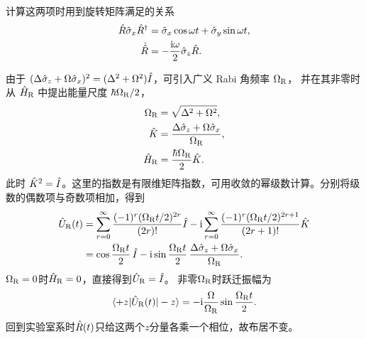 计算这两项时用到旋转矩阵满足的关系
\[
    \begin{alignedat}{1}
        \hat{R}\hat{\sigma}_x\hat{R}^\dagger
            &= \hat{\sigma}_x\cos\omega t + \hat{\sigma}_y\sin\omega t,\\
        \dot{\hat{R}} &= -\frac{\mathrm{i}\omega}{2}\hat{\sigma}_z\hat{R}.
    \end{alignedat}
\]

由于 $(\Delta\hat{\sigma}_z + \Omega\hat{\sigma}_x)^2 = (\Delta^2 + \Omega^2)\hat{I}$，可引入广义 Rabi 角频率 $\Omega_{\mathrm{R}}$，
并在其非零时从 $\hat{H}_{\mathrm{R}}$ 中提出能量尺度 $\hbar\Omega_{\mathrm{R}}/2$，
\begin{subequations}
    \begin{align}
        \Omega_{\mathrm{R}} &= \sqrt{\Delta^2 + \Omega^2},\\
        \hat{K} &= \frac{\Delta\hat{\sigma}_z + \Omega\hat{\sigma}_x}{\Omega_{\mathrm{R}}},\\
        \hat{H}_{\mathrm{R}} &= \frac{\hbar\Omega_{\mathrm{R}}}{2}\hat{K} .
    \end{align}
\end{subequations}
此时 $\hat{K}^2 = \hat{I}$。这里的指数是有限维矩阵指数，可用收敛的幂级数计算。分别将级数的偶数项与奇数项相加，得到
\begin{equation}
    \begin{alignedat}{1}
        \hat{U}_{\mathrm{R}}(t) &= \sum_{r=0}^\infty
            \frac{(-1)^r(\Omega_{\mathrm{R}}t/2)^{2r}}{(2r)!}\hat{I}
            - \mathrm{i}\sum_{r=0}^\infty
            \frac{(-1)^r(\Omega_{\mathrm{R}}t/2)^{2r+1}}{(2r + 1)!}\hat{K}\\
        &= \cos\frac{\Omega_{\mathrm{R}}t}{2}\,\hat{I}
            - \mathrm{i}\sin\frac{\Omega_{\mathrm{R}}t}{2}\,
            \frac{\Delta\hat{\sigma}_z + \Omega\hat{\sigma}_x}{\Omega_{\mathrm{R}}}.
    \end{alignedat}
\end{equation}
$\Omega_{\mathrm{R}} = 0$时$\hat{H}_{\mathrm{R}} = 0$，直接得到$\hat{U}_{\mathrm{R}} = \hat{I}$。
非零$\Omega_{\mathrm{R}}$时跃迁振幅为
\begin{equation}
    \langle+z\vert\hat{U}_{\mathrm{R}}(t)\vert-z\rangle
    = -\mathrm{i}\frac{\Omega}{\Omega_{\mathrm{R}}}\sin\frac{\Omega_{\mathrm{R}}t}{2}.
\end{equation}
回到实验室系时$\hat{R}(t)$只给这两个$z$分量各乘一个相位，故布居不变。

